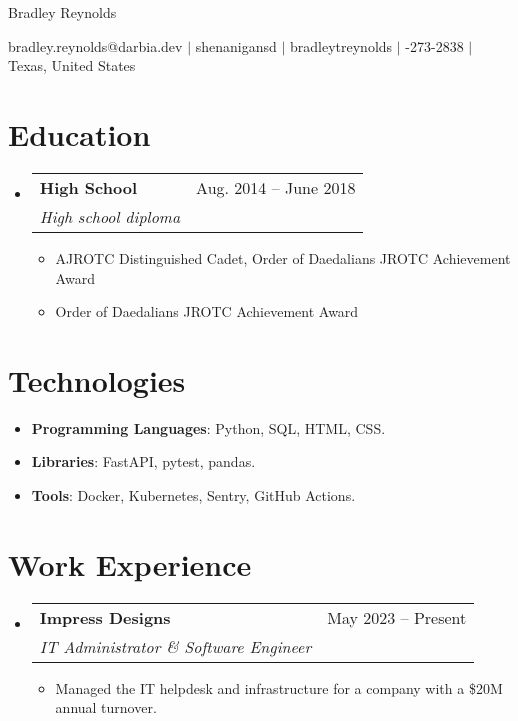 \documentclass[letterpaper,11pt]{article}
\makeatletter
\newcommand{\resumeItem}[1]{
  \item\small{
    {#1 \vspace{-2pt}}
  }
}
\newcommand{\resumeSubheading}[4]{
  \vspace{-2pt}\item
    \begin{tabular*}{0.97\textwidth}[t]{l@{\extracolsep{\fill}}r}
      \textbf{#1} & #2 \\
      \textit{\small#3} & \textit{\small #4} \\
    \end{tabular*}\vspace{-7pt}
}
\newcommand{\resumeSubItem}[1]{\resumeItem{#1}\vspace{-4pt}}
\newcommand{\resumeSubheadingListStart}{\begin{itemize}[leftmargin=0.15in, label={}]}
\newcommand{\resumeSubheadingListEnd}{\end{itemize}}
\newcommand{\resumeItemListStart}{\begin{itemize}}
\newcommand{\resumeItemListEnd}{\end{itemize}}
\newcommand{\myemail}{bradley.reynolds@darbia.dev}
\newcommand{\myname}{Bradley Reynolds}
\newcommand{\mygh}{shenanigansd}
\newcommand{\mylinkedin}{bradleytreynolds}
\newcommand{\myphone}{940-273-2838}
\newcommand{\mylocation}{Texas, United States}
\newcommand{\myemail}{bradley.reynolds@darbia.dev}
\newcommand{\myname}{Bradley Reynolds}
\newcommand{\mygh}{shenanigansd}
\newcommand{\mylinkedin}{bradleytreynolds}
\newcommand{\myphone}{940-273-2838}
\newcommand{\mylocation}{Texas, United States}
\makeatother
\begin{document}
{\Huge \myname}
\\
\vspace{2pt}

\small{
    \faEnvelope
    \thinspace \thinspace
    \myemail
    \thinspace \thinspace $|$
    \faGithub
    \thinspace \thinspace
    \mygh
    \thinspace \thinspace $|$
    \faLinkedin
    \thinspace \thinspace
    \mylinkedin
    \thinspace \thinspace $|$
    \faPhone
    \thinspace \thinspace
    \myphone
    \thinspace \thinspace $|$
    \thinspace \thinspace
    \mylocation
}

\vspace{-11pt}

\section{Education}
  \resumeSubheadingListStart
    \resumeSubheading{High School}{Aug. 2014 -- June 2018}{High school diploma}{}
    \resumeItemListStart
        \resumeItem{AJROTC Distinguished Cadet, Order of Daedalians JROTC Achievement Award}
        \resumeItem{Order of Daedalians JROTC Achievement Award}
    \resumeItemListEnd
  \resumeSubheadingListEnd

\section{Technologies}
\resumeSubheadingListStart
    \resumeSubItem{\textbf{Programming Languages}{:
        Python,
        SQL,
        HTML,
        CSS.
    }} \\
    \resumeSubItem{\textbf{Libraries}{:
        FastAPI,
        pytest,
        pandas.
    }} \\
    \resumeSubItem{\textbf{Tools}{:
        Docker,
        Kubernetes,
        Sentry,
        GitHub Actions.
    }}
\resumeSubheadingListEnd

\section{Work Experience}
    \resumeSubheadingListStart
        \resumeSubheading{Impress Designs}{May 2023 -- Present}{IT Administrator \& Software Engineer}{}
        \resumeItemListStart
            \resumeItem{Managed the IT helpdesk and infrastructure for a company with a \$20M annual turnover.}
        \resumeItemListEnd
    \resumeSubheadingListEnd
\end{document}

